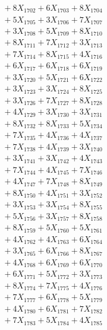 \documentclass[a4paper,10pt]{article}
\begin{document}
{\begin{align}
&\;  + 8 X_{1702} + 6 X_{1703} + 8 X_{1704} \\[0.3ex]
&\;  + 5 X_{1705} + 3 X_{1706} + 7 X_{1707} \\[0.3ex]
&\;  + 3 X_{1708} + 5 X_{1709} + 8 X_{1710} \\[0.3ex]
&\;  + 8 X_{1711} + 7 X_{1712} + 3 X_{1713} \\[0.3ex]
&\;  + 7 X_{1714} + 8 X_{1715} + 4 X_{1716} \\[0.3ex]
&\;  + 6 X_{1717} + 6 X_{1718} + 6 X_{1719} \\[0.5ex]\allowbreak
&\;  + 3 X_{1720} + 5 X_{1721} + 6 X_{1722} \\[0.3ex]
&\;  + 3 X_{1723} + 3 X_{1724} + 8 X_{1725} \\[0.3ex]
&\;  + 3 X_{1726} + 7 X_{1727} + 8 X_{1728} \\[0.3ex]
&\;  + 4 X_{1729} + 3 X_{1730} + 3 X_{1731} \\[0.3ex]
&\;  + 8 X_{1732} + 8 X_{1733} + 5 X_{1734} \\[0.3ex]
&\;  + 7 X_{1735} + 4 X_{1736} + 4 X_{1737} \\[0.3ex]
&\;  + 7 X_{1738} + 4 X_{1739} + 3 X_{1740} \\[0.3ex]
&\;  + 3 X_{1741} + 3 X_{1742} + 4 X_{1743} \\[0.3ex]
&\;  + 7 X_{1744} + 4 X_{1745} + 7 X_{1746} \\[0.3ex]
&\;  + 4 X_{1747} + 7 X_{1748} + 8 X_{1749} \\[0.5ex]\allowbreak
&\;  + 8 X_{1750} + 4 X_{1751} + 3 X_{1752} \\[0.3ex]
&\;  + 3 X_{1753} + 3 X_{1754} + 8 X_{1755} \\[0.3ex]
&\;  + 5 X_{1756} + 3 X_{1757} + 8 X_{1758} \\[0.3ex]
&\;  + 8 X_{1759} + 5 X_{1760} + 5 X_{1761} \\[0.3ex]
&\;  + 4 X_{1762} + 4 X_{1763} + 6 X_{1764} \\[0.3ex]
&\;  + 3 X_{1765} + 6 X_{1766} + 8 X_{1767} \\[0.3ex]
&\;  + 4 X_{1768} + 6 X_{1769} + 6 X_{1770} \\[0.3ex]
&\;  + 6 X_{1771} + 5 X_{1772} + 3 X_{1773} \\[0.3ex]
&\;  + 8 X_{1774} + 7 X_{1775} + 4 X_{1776} \\[0.3ex]
&\;  + 7 X_{1777} + 6 X_{1778} + 5 X_{1779} \\[0.5ex]\allowbreak
&\;  + 4 X_{1780} + 6 X_{1781} + 7 X_{1782} \\[0.3ex]
&\;  + 7 X_{1783} + 5 X_{1784} + 4 X_{1785} \\[0.3ex]

\end{align}}
\end{document}
